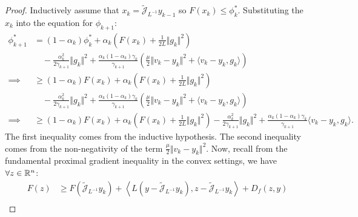 \documentclass[12pt]{article}
\begin{document}
    \begin{proof}
        Inductively assume that $x_k = \widetilde{\mathcal J}_{L^{-1}}y_{k - 1}$ so $F(x_k) \le \phi_k^*$. 
        Substituting the $x_k$ into the equation for $\phi_{k + 1}$: 
        {\small
        \begin{align*}
            \phi_{k + 1}^* &= 
            (1 - \alpha_k) \phi_k^*
            + 
            \alpha_k
            \left(
                F(x_k) + \frac{1}{2L}\Vert g_k\Vert^2
            \right)
            \\&\quad 
                - \frac{\alpha_k^2}{2\gamma_{k + 1}}\Vert g_k\Vert^2
                + \frac{\alpha_k (1 - \alpha_k)\gamma_k}{\gamma_{k + 1}}
                \left(
                    \frac{\mu}{2}\Vert v_k - y_k\Vert^2 + \langle v_k - y_k, g_k\rangle
                \right)
            \\
            \implies 
            &\ge 
            (1 - \alpha_k)F(x_k)
            + 
            \alpha_k
            \left(
                F(x_k) + \frac{1}{2L}\Vert g_k\Vert^2
            \right)
            \\&\quad
                - \frac{\alpha_k^2}{2\gamma_{k + 1}}\Vert g_k\Vert^2
                + \frac{\alpha_k (1 - \alpha_k)\gamma_k}{\gamma_{k + 1}}
                \left(
                    \frac{\mu}{2}\Vert v_k - y_k\Vert^2 + \langle v_k - y_k, g_k\rangle
                \right)
            \\
            \implies
            &\ge 
            (1 - \alpha_k)F(x_k)
            + 
            \alpha_k
            \left(
                F(x_k) + \frac{1}{2L}\Vert g_k\Vert^2
            \right)
            - \frac{\alpha_k^2}{2\gamma_{k + 1}}\Vert g_k\Vert^2
            + 
            \frac{\alpha_k (1 - \alpha_k)\gamma_k}{\gamma_{k + 1}}
            \langle v_k - y_k, g_k\rangle. 
        \end{align*}
        }
        The first inequality comes from the inductive hypothesis. 
        The second inequality comes from the non-negativity of the term $\frac{\mu}{2}\Vert v_k - y_k\Vert^2$. 
        Now, recall from the fundamental proximal gradient inequality in the convex settings, we have $\forall z\in \mathbb R^n$: 
        \begin{align*}
            F(z) &\ge 
            F\left(\widetilde{\mathcal J}_{L^{-1}}y_k\right)
            + \left\langle 
                L(y - \widetilde{\mathcal J}_{L^{-1}}y_k), 
                z - \widetilde{\mathcal J}_{L^{-1}}y_k
            \right\rangle + D_f(z, y)
            \\

\end{align*}
\end{proof}
\end{document}

